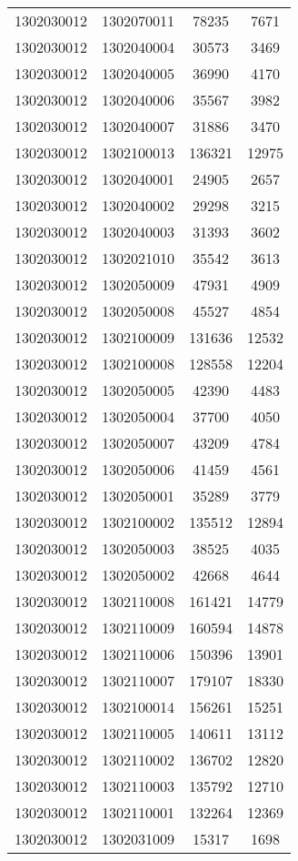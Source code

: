 \begin{longtable}{llcc}
1302030012 & 1302070011 & 78235 & 7671\\
1302030012 & 1302040004 & 30573 & 3469\\
1302030012 & 1302040005 & 36990 & 4170\\
1302030012 & 1302040006 & 35567 & 3982\\
1302030012 & 1302040007 & 31886 & 3470\\
1302030012 & 1302100013 & 136321 & 12975\\
1302030012 & 1302040001 & 24905 & 2657\\
1302030012 & 1302040002 & 29298 & 3215\\
1302030012 & 1302040003 & 31393 & 3602\\
1302030012 & 1302021010 & 35542 & 3613\\
1302030012 & 1302050009 & 47931 & 4909\\
1302030012 & 1302050008 & 45527 & 4854\\
1302030012 & 1302100009 & 131636 & 12532\\
1302030012 & 1302100008 & 128558 & 12204\\
1302030012 & 1302050005 & 42390 & 4483\\
1302030012 & 1302050004 & 37700 & 4050\\
1302030012 & 1302050007 & 43209 & 4784\\
1302030012 & 1302050006 & 41459 & 4561\\
1302030012 & 1302050001 & 35289 & 3779\\
1302030012 & 1302100002 & 135512 & 12894\\
1302030012 & 1302050003 & 38525 & 4035\\
1302030012 & 1302050002 & 42668 & 4644\\
1302030012 & 1302110008 & 161421 & 14779\\
1302030012 & 1302110009 & 160594 & 14878\\
1302030012 & 1302110006 & 150396 & 13901\\
1302030012 & 1302110007 & 179107 & 18330\\
1302030012 & 1302100014 & 156261 & 15251\\
1302030012 & 1302110005 & 140611 & 13112\\
1302030012 & 1302110002 & 136702 & 12820\\
1302030012 & 1302110003 & 135792 & 12710\\
1302030012 & 1302110001 & 132264 & 12369\\
1302030012 & 1302031009 & 15317 & 1698\\

\end{longtable}
